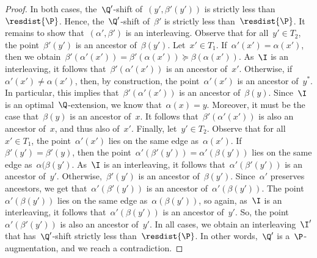 \begin{proof}
    In both cases, the~$\Q'$-shift of~$(y', \beta'(y'))$ is strictly less than~$\resdist{\P}$.
    Hence, the~$\Q'$-shift of~$\beta'$ is strictly less than~$\resdist{\P}$.
%
    It remains to show that~$(\alpha',\beta')$ is an interleaving.
    Observe that for all~$y' \in T_2$, the point~$\beta'(y')$ is an ancestor of~$\beta(y')$. 
    Let~$x' \in T_1$.
    If~$\alpha'(x') = \alpha(x')$, then we obtain~$\beta'(\alpha'(x')) = \beta'(\alpha(x')) \succeq \beta(\alpha(x'))$.
    As~$\I$ is an interleaving, it follows that~$\beta'(\alpha'(x'))$ is an ancestor of~$x'$.
    Otherwise, if~$\alpha'(x') \neq \alpha(x')$, then, by construction, the point~$\alpha'(x')$ is an ancestor of~$y^*$.
    In particular, this implies that~$\beta'(\alpha'(x'))$ is an ancestor of~$\beta(y)$.
    Since~$\I$ is an optimal~$\Q$-extension, we know that~$\alpha(x) = y$.
    Moreover, it must be the case that~$\beta(y)$ is an ancestor of~$x$.
    It follows that~$\beta'(\alpha'(x'))$ is also an ancestor of~$x$, and thus also of~$x'$.    
    Finally, let~$y' \in T_2$.
    Observe that for all~$x' \in T_1$, the point~$\alpha'(x')$ lies on the same edge as~$\alpha(x')$.
    If~$\beta'(y') = \beta'(y)$, then the point~$\alpha'(\beta'(y')) = \alpha'(\beta(y'))$ lies on the same edge as~$\alpha(\beta(y')$.
    As~$\I$ is an interleaving, it follows that~$\alpha'(\beta'(y'))$ is an ancestor of~$y'$.
    Otherwise,~$\beta'(y')$ is an ancestor of~$\beta(y')$.
    Since~$\alpha'$ preserves ancestors, we get that~$\alpha'(\beta'(y'))$ is an ancestor of~$\alpha'(\beta(y'))$.
    The point~$\alpha'(\beta(y'))$ lies on the same edge as~$\alpha(\beta(y'))$, so again, as~$\I$ is an interleaving, it follows that~$\alpha'(\beta(y'))$ is an ancestor of~$y'$.
    So, the point~$\alpha'(\beta'(y'))$ is also an ancestor of~$y'$.
%
%
    In all cases, we obtain an interleaving~$\I'$ that has~$\Q'$-shift strictly less than~$\resdist{\P}$.
    In other words,~$\Q'$ is a~$\P$-augmentation, and we reach a contradiction.
\end{proof}
%
%
